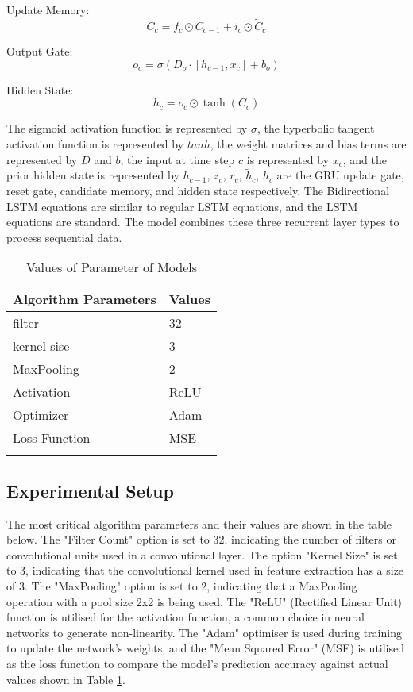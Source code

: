 Update Memory:
\begin{equation}
C_c = f_c \odot C_{c-1} + i_c \odot \tilde{C}_c
\end{equation}

Output Gate:
\begin{equation}
o_c = \sigma(D_o \cdot [h_{c-1}, x_c] + b_o)
\end{equation}

Hidden State:
\begin{equation}
h_c = o_c \odot \tanh(C_c)
\end{equation}

The sigmoid activation function is represented by $\sigma$, the hyperbolic tangent activation function is represented by $tanh$, the weight matrices and bias terms are represented by $D$ and $b$, the input at time step $c$ is represented by $x_c$, and the prior hidden state is represented by $h_{c-1}$, $z_c$, $r_c$, $\tilde{h}_c$, $h_c$ are the GRU update gate, reset gate, candidate memory, and hidden state respectively. The Bidirectional LSTM equations are similar to regular LSTM equations, and the LSTM equations are standard. The model combines these three recurrent layer types to process sequential data.



\begin{table}[!ht]
  \centering
  \setlength{\tabcolsep}{3pt}
  {\renewcommand{\arraystretch}{1}%
  \caption{Values of Parameter of Models}
  \begin{tabular}{|p{}| p{}|}
  \hline
  Algorithm Parameters & Values \\ \hline
  filter & 32 \\
  kernel sise & 3 \\
  MaxPooling & 2 \\
  Activation & ReLU \\
  Optimizer & Adam \\
  Loss Function & MSE \\ \hline
  \label{Table 2}
  \end{tabular}%
  }
  \end{table}
  
  
  \subsection{Experimental Setup} The most critical algorithm parameters and their values are shown in the table below. The "Filter Count" option is set to 32, indicating the number of filters or convolutional units used in a convolutional layer. The option "Kernel Size" is set to 3, indicating that the convolutional kernel used in feature extraction has a size of 3. The "MaxPooling" option is set to 2, indicating that a MaxPooling operation with a pool size 2x2 is being used. The "ReLU" (Rectified Linear Unit) function is utilised for the activation function, a common choice in neural networks to generate non-linearity. The "Adam" optimiser is used during training to update the network's weights, and the "Mean Squared Error" (MSE) is utilised as the loss function to compare the model's prediction accuracy against actual values shown in Table \ref{Table 2}.
  